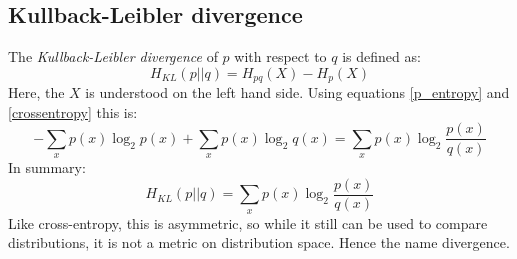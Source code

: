 \documentclass[12pt, a4paper]{article}
\numberwithin{equation}{section}
\begin{document}
\subsection{Kullback-Leibler divergence}
The \textit{Kullback-Leibler divergence} of $p$ with respect to $q$ is defined as:
\begin{equation}
H_{KL}(p||q)=H_{pq}(X)-H_p(X)
\end{equation} 
Here, the $X$ is understood on the left hand side. Using equations \ref{p_entropy} and \ref{crossentropy} this is:
\begin{equation}
-\sum_x p(x)\log_2 p(x)+\sum_x p(x)\log_2 q(x)=\sum_x p(x)\log_2\frac{p(x)}{q(x)}
\end{equation}
In summary:
\begin{equation}
\label{kl_divergence}
H_{KL}(p||q)=\sum_x p(x)\log_2\frac{p(x)}{q(x)}
\end{equation}
Like cross-entropy, this is asymmetric, so while it still can be used to compare distributions, it is not a metric on distribution space. Hence the name divergence.
\end{document}
